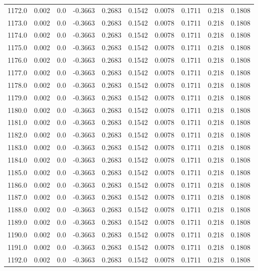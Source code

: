 \begin{longtable}{lrrrrrrrrr}
1172.0 & 0.002 & 0.0 & -0.3663 & 0.2683 & 0.1542 & 0.0078 & 0.1711 & 0.218 & 0.1808 \\
1173.0 & 0.002 & 0.0 & -0.3663 & 0.2683 & 0.1542 & 0.0078 & 0.1711 & 0.218 & 0.1808 \\
1174.0 & 0.002 & 0.0 & -0.3663 & 0.2683 & 0.1542 & 0.0078 & 0.1711 & 0.218 & 0.1808 \\
1175.0 & 0.002 & 0.0 & -0.3663 & 0.2683 & 0.1542 & 0.0078 & 0.1711 & 0.218 & 0.1808 \\
1176.0 & 0.002 & 0.0 & -0.3663 & 0.2683 & 0.1542 & 0.0078 & 0.1711 & 0.218 & 0.1808 \\
1177.0 & 0.002 & 0.0 & -0.3663 & 0.2683 & 0.1542 & 0.0078 & 0.1711 & 0.218 & 0.1808 \\
1178.0 & 0.002 & 0.0 & -0.3663 & 0.2683 & 0.1542 & 0.0078 & 0.1711 & 0.218 & 0.1808 \\
1179.0 & 0.002 & 0.0 & -0.3663 & 0.2683 & 0.1542 & 0.0078 & 0.1711 & 0.218 & 0.1808 \\
1180.0 & 0.002 & 0.0 & -0.3663 & 0.2683 & 0.1542 & 0.0078 & 0.1711 & 0.218 & 0.1808 \\
1181.0 & 0.002 & 0.0 & -0.3663 & 0.2683 & 0.1542 & 0.0078 & 0.1711 & 0.218 & 0.1808 \\
1182.0 & 0.002 & 0.0 & -0.3663 & 0.2683 & 0.1542 & 0.0078 & 0.1711 & 0.218 & 0.1808 \\
1183.0 & 0.002 & 0.0 & -0.3663 & 0.2683 & 0.1542 & 0.0078 & 0.1711 & 0.218 & 0.1808 \\
1184.0 & 0.002 & 0.0 & -0.3663 & 0.2683 & 0.1542 & 0.0078 & 0.1711 & 0.218 & 0.1808 \\
1185.0 & 0.002 & 0.0 & -0.3663 & 0.2683 & 0.1542 & 0.0078 & 0.1711 & 0.218 & 0.1808 \\
1186.0 & 0.002 & 0.0 & -0.3663 & 0.2683 & 0.1542 & 0.0078 & 0.1711 & 0.218 & 0.1808 \\
1187.0 & 0.002 & 0.0 & -0.3663 & 0.2683 & 0.1542 & 0.0078 & 0.1711 & 0.218 & 0.1808 \\
1188.0 & 0.002 & 0.0 & -0.3663 & 0.2683 & 0.1542 & 0.0078 & 0.1711 & 0.218 & 0.1808 \\
1189.0 & 0.002 & 0.0 & -0.3663 & 0.2683 & 0.1542 & 0.0078 & 0.1711 & 0.218 & 0.1808 \\
1190.0 & 0.002 & 0.0 & -0.3663 & 0.2683 & 0.1542 & 0.0078 & 0.1711 & 0.218 & 0.1808 \\
1191.0 & 0.002 & 0.0 & -0.3663 & 0.2683 & 0.1542 & 0.0078 & 0.1711 & 0.218 & 0.1808 \\
1192.0 & 0.002 & 0.0 & -0.3663 & 0.2683 & 0.1542 & 0.0078 & 0.1711 & 0.218 & 0.1808 \\

\end{longtable}
